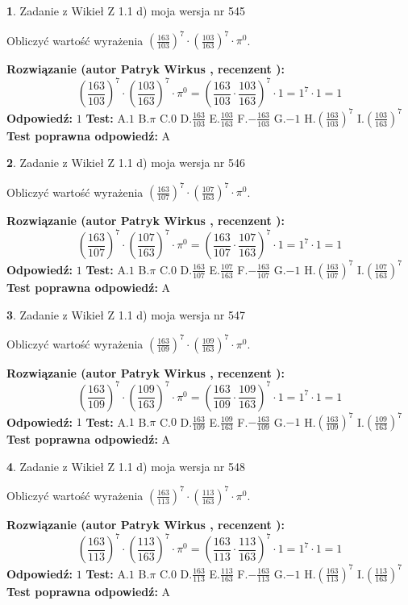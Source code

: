 \documentclass[12pt, a4paper]{article}
\theoremstyle{definition} %
\newtheorem{zad}{}
\newcommand{\zadStart}[1]{\begin{zad}#1\newline}
\newcommand{\zadStop}{\end{zad}}
\newcommand{\rozwStart}[2]{\noindent \textbf{Rozwiązanie (autor #1 , recenzent #2): }\newline}
\newcommand{\rozwStop}{\newline}
\newcommand{\odpStart}{\noindent \textbf{Odpowiedź:}\newline}
\newcommand{\odpStop}{\newline}
\newcommand{\testStart}{\noindent \textbf{Test:}\newline}
\newcommand{\testStop}{\newline}
\newcommand{\kluczStart}{\noindent \textbf{Test poprawna odpowiedź:}\newline}
\newcommand{\kluczStop}{\newline}
\begin{document}
\zadStart{Zadanie z Wikieł Z 1.1 d) moja wersja nr 545}

Obliczyć wartość wyrażenia $(\frac{163}{103})^{7} \cdot (\frac{103}{163})^{7} \cdot \pi^{0}$.
\zadStop
\rozwStart{Patryk Wirkus}{}
$$(\frac{163}{103})^{7} \cdot (\frac{103}{163})^{7} \cdot \pi^{0} = (\frac{163}{103} \cdot \frac{103}{163})^{7} \cdot 1 = 1^{7} \cdot 1 = 1$$
\rozwStop
\odpStart
$1$
\odpStop
\testStart
A.$1$ B.$\pi$ C.$0$ D.$\frac{163}{103}$ E.$\frac{103}{163}$
F.$-\frac{163}{103}$ G.$-1$
H.$(\frac{163}{103})^{7}$
I.$(\frac{103}{163})^{7}$
\testStop
\kluczStart
A
\kluczStop



\zadStart{Zadanie z Wikieł Z 1.1 d) moja wersja nr 546}

Obliczyć wartość wyrażenia $(\frac{163}{107})^{7} \cdot (\frac{107}{163})^{7} \cdot \pi^{0}$.
\zadStop
\rozwStart{Patryk Wirkus}{}
$$(\frac{163}{107})^{7} \cdot (\frac{107}{163})^{7} \cdot \pi^{0} = (\frac{163}{107} \cdot \frac{107}{163})^{7} \cdot 1 = 1^{7} \cdot 1 = 1$$
\rozwStop
\odpStart
$1$
\odpStop
\testStart
A.$1$ B.$\pi$ C.$0$ D.$\frac{163}{107}$ E.$\frac{107}{163}$
F.$-\frac{163}{107}$ G.$-1$
H.$(\frac{163}{107})^{7}$
I.$(\frac{107}{163})^{7}$
\testStop
\kluczStart
A
\kluczStop



\zadStart{Zadanie z Wikieł Z 1.1 d) moja wersja nr 547}

Obliczyć wartość wyrażenia $(\frac{163}{109})^{7} \cdot (\frac{109}{163})^{7} \cdot \pi^{0}$.
\zadStop
\rozwStart{Patryk Wirkus}{}
$$(\frac{163}{109})^{7} \cdot (\frac{109}{163})^{7} \cdot \pi^{0} = (\frac{163}{109} \cdot \frac{109}{163})^{7} \cdot 1 = 1^{7} \cdot 1 = 1$$
\rozwStop
\odpStart
$1$
\odpStop
\testStart
A.$1$ B.$\pi$ C.$0$ D.$\frac{163}{109}$ E.$\frac{109}{163}$
F.$-\frac{163}{109}$ G.$-1$
H.$(\frac{163}{109})^{7}$
I.$(\frac{109}{163})^{7}$
\testStop
\kluczStart
A
\kluczStop



\zadStart{Zadanie z Wikieł Z 1.1 d) moja wersja nr 548}

Obliczyć wartość wyrażenia $(\frac{163}{113})^{7} \cdot (\frac{113}{163})^{7} \cdot \pi^{0}$.
\zadStop
\rozwStart{Patryk Wirkus}{}
$$(\frac{163}{113})^{7} \cdot (\frac{113}{163})^{7} \cdot \pi^{0} = (\frac{163}{113} \cdot \frac{113}{163})^{7} \cdot 1 = 1^{7} \cdot 1 = 1$$
\rozwStop
\odpStart
$1$
\odpStop
\testStart
A.$1$ B.$\pi$ C.$0$ D.$\frac{163}{113}$ E.$\frac{113}{163}$
F.$-\frac{163}{113}$ G.$-1$
H.$(\frac{163}{113})^{7}$
I.$(\frac{113}{163})^{7}$
\testStop
\kluczStart
A
\kluczStop
\end{document}
